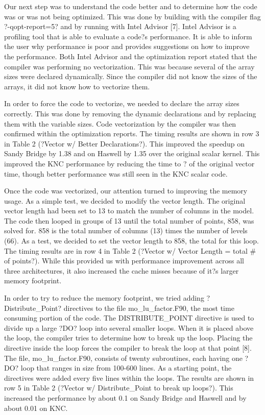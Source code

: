 Our next step was to understand the code better and to determine how the code was or was not being optimized.  This was done by building with the compiler flag ?-qopt-report=5? and by running with Intel Advisor [7].  Intel Advisor is a profiling tool that is able to evaluate a code?s performance.   It is able to inform the user why performance is poor and provides suggestions on how to improve the performance.  Both Intel Advisor and the optimization report stated that the compiler was performing no vectorization.  This was because several of the array sizes were declared dynamically.  Since the compiler did not know the sizes of the arrays, it did not know how to vectorize them.

In order to force the code to vectorize, we needed to declare the array sizes correctly.  This was done by removing the dynamic declarations and by replacing them with the variable sizes.  Code vectorization by the compiler was then confirmed within the optimization reports.  The timing results are shown in row 3 in Table 2 (?Vector w/ Better Declarations?).  This improved the speedup on Sandy Bridge by 1.38 and on Haswell by 1.35 over the original scalar kernel.  This improved the KNC performance by reducing the time to ? of the original vector time, though better performance was still seen in the KNC scalar code.

Once the code was vectorized, our attention turned to improving the memory usage.  As a simple test, we decided to modify the vector length.  The original vector length had been set to 13 to match the number of columns in the model.  The code then looped in groups of 13 until the total number of points, 858, was solved for.  858 is the total number of columns (13) times the number of levels (66).  As a test, we decided to set the vector length to 858, the total for this loop.  The timing results are in row 4 in Table 2 (?Vector w/ Vector Length = total \# of points?).  While this provided us with performance improvement across all three architectures, it also increased the cache misses because of it?s larger memory footprint.

 

In order to try to reduce the memory footprint, we tried adding ?Distribute\_Point? directives to the file mo\_lu\_factor.F90, the most time consuming portion of the code.  The DISTRIBUTE\_POINT directive is used to divide up a large ?DO? loop into several smaller loops.  When it is placed above the loop, the compiler tries to determine how to break up the loop.  Placing the directive inside the loop forces the compiler to break the loop at that point [8].  The file, mo\_lu\_factor.F90,  consists of twenty subroutines, each having one ?DO? loop that ranges in size from 100-600 lines.  As a starting point, the directives were added every five lines within the loops.  The results are shown in row 5 in Table 2 (?Vector w/ Distribute\_Point to break up loops?).  This increased the performance by about 0.1 on Sandy Bridge and Haswell and by about 0.01 on KNC.  

